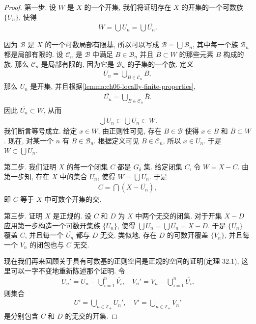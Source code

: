 \documentclass[../../main.tex]{subfiles}
\begin{document}
\begin{proof}
第一步. 设 $W$ 是 $X$ 的一个开集, 我们将证明存在 $X$ 的开集的一个可数族 $\{U_n\}$, 使得
\begin{align*}
W=\bigcup U_n=\bigcup\overline{U_n}.
\end{align*}

因为 $\mathcal{B}$ 是 $X$ 的一个可数局部有限基, 所以可以写成 $\mathcal{B}=\bigcup\mathcal{B}_n$, 其中每一个族 $\mathcal{B}_n$ 都是局部有限的. 设 $\mathcal{C}_n$ 是 $\mathcal{B}$ 中满足 $B\in\mathcal{B}_n$ 并且 $\overline{B}\subset W$ 的那些元素 $B$ 构成的族. 那么 $\mathcal{C}_n$ 是局部有限的, 因为它是 $\mathcal{B}_n$ 的子集的一个族. 定义
\begin{align*}
U_n=\bigcup_{B\in\mathcal{C}_n}B,
\end{align*}
那么 $U_n$ 是开集, 并且根据\cref{lemma:ch06-locally-finite-properties},
\begin{align*}
\overline{U_n}=\bigcup_{B\in\mathcal{C}_n}\overline{B}.
\end{align*}
因此 $\overline{U_n}\subset W$, 从而
\begin{align*}
\bigcup U_n\subset\bigcup\overline{U_n}\subset W.
\end{align*}
我们断言等号成立. 给定 $x\in W$, 由正则性可见, 存在 $B\in\mathcal{B}$ 使得 $x\in B$ 和 $\overline{B}\subset W$. 现在, 对某一个 $n$ 有 $B\in\mathcal{B}_n$. 根据定义可见 $B\in\mathcal{C}_n$, 所以 $x\in U_n$. 于是 $W\subset\bigcup U_n$.

第二步. 我们证明 $X$ 的每一个闭集 $C$ 都是 $G_\delta$ 集. 给定闭集 $C$, 令 $W=X-C$. 由第一步知, 存在 $X$ 中的集合 $U_n$, 使得 $W=\bigcup\overline{U_n}$. 于是
\begin{align*}
C=\bigcap(X-\overline{U_n}),
\end{align*}
即 $C$ 等于 $X$ 中可数个开集的交.

第三步. 证明 $X$ 是正规的. 设 $C$ 和 $D$ 为 $X$ 中两个无交的闭集. 对于开集 $X-D$ 应用第一步构造一个可数开集族 $\{U_n\}$, 使得 $\bigcup U_n=\bigcup\overline{U_n}=X-D$. 于是 $\{U_n\}$ 覆盖 $C$, 并且每一个 $\overline{U_n}$ 都与 $D$ 无交. 类似地, 存在 $D$ 的可数开覆盖 $\{V_n\}$, 并且每一个 $V_n$ 的闭包也与 $C$ 无交.

现在我们再来回顾关于具有可数基的正则空间是正规的空间的证明(定理 32.1), 这里可以一字不变地重新陈述那个证明. 令
\begin{align*}
U_n'=U_n-\bigcup_{i=1}^n\overline{V_i},\quad V_n'=V_n-\bigcup_{i=1}^n\overline{U_i}.
\end{align*}
则集合
\begin{align*}
U'=\bigcup_{n\in\mathbb{Z}_+}U_n',\quad V'=\bigcup_{n\in\mathbb{Z}_+}V_n'
\end{align*}
是分别包含 $C$ 和 $D$ 的无交的开集.
\end{proof}
\end{document}
